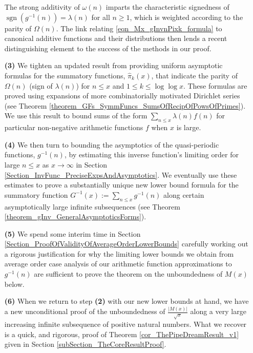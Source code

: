 \documentclass[11pt,reqno,a4letter]{article}
\numberwithin{figure}{section}
\numberwithin{table}{section}
\theoremstyle{plain}
\numberwithin{theorem}{section}
\theoremstyle{definition}
\begin{document}
\begin{itemize}
           The strong additivity of $\omega(n)$ imparts the characteristic signedness of 
           $\operatorname{sgn}(g^{-1}(n)) = \lambda(n)$ for all $n \geq 1$, which is weighted 
           according to the parity of $\Omega(n)$. 
           The link relating \eqref{eqn_Mx_gInvnPixk_formula} to canonical additive functions and their 
           distributions then lends a recent distinguishing element to the 
           success of the methods in our proof. 
\item[\textbf{(3)}] We tighten an updated result from \cite[\S 7]{MV} providing uniform asymptotic formulas for the  
           summatory functions, $\widehat{\pi}_k(x)$, that indicate the parity of 
           $\Omega(n)$ (sign of $\lambda(n)$) 
           for $n \leq x$ and $1 \leq k \leq \log\log x$. These formulas are proved using expansions of 
           more combinatorially motivated Dirichlet series 
           (see Theorem \ref{theorem_GFs_SymmFuncs_SumsOfRecipOfPowsOfPrimes}). 
           We use this result to bound sums of the form 
           $\sum_{n \leq x} \lambda(n) f(n)$ for particular non-negative arithmetic 
           functions $f$ when $x$ is large. 
\item[\textbf{(4)}] We then turn to bounding the 
           asymptotics of the quasi-periodic functions, $g^{-1}(n)$, by estimating this inverse function's 
           limiting order for large $n \leq x$ as $x \rightarrow \infty$ in 
           Section \ref{Section_InvFunc_PreciseExpsAndAsymptotics}. 
           We eventually use these estimates to prove a substantially unique new lower bound formula 
           for the summatory function $G^{-1}(x) := \sum_{n \leq x} g^{-1}(n)$ along certain asymptotically large 
           infinite subsequences (see Theorem \ref{theorem_gInv_GeneralAsymptoticsForms}). 
\item[\textbf{(5)}] We spend some interim time in Section \ref{Section_ProofOfValidityOfAverageOrderLowerBounds} 
           carefully working out a rigorous justification for why the limiting lower bounds we obtain from average 
           order case analysis of our arithmetic function approximations 
           to $g^{-1}(n)$ are sufficient to prove the theorem on the unboundedness of $M(x)$ below. 
\item[\textbf{(6)}] When we return to step \textbf{(2)} 
           with our new lower bounds at hand, we have a new unconditional proof of the 
           unboundedness of $\frac{|M(x)|}{\sqrt{x}}$ 
           along a very large increasing infinite subsequence 
           of positive natural numbers. What we recover is a quick, and rigorous, proof of 
           Theorem \ref{cor_ThePipeDreamResult_v1} given in 
           Section \ref{subSection_TheCoreResultProof}. 
           
\end{itemize} 
\end{document}
